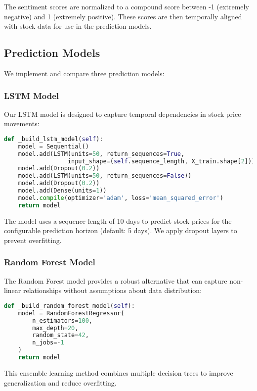 \documentclass[review]{elsarticle}
\begin{document}
The sentiment scores are normalized to a compound score between -1 (extremely negative) and 1 (extremely positive). These scores are then temporally aligned with stock data for use in the prediction models.

\subsection{Prediction Models}

We implement and compare three prediction models:

\subsubsection{LSTM Model}

Our LSTM model is designed to capture temporal dependencies in stock price movements:

\begin{lstlisting}[language=Python, caption=LSTM Model Architecture]
def _build_lstm_model(self):
    model = Sequential()
    model.add(LSTM(units=50, return_sequences=True, 
                  input_shape=(self.sequence_length, X_train.shape[2])))
    model.add(Dropout(0.2))
    model.add(LSTM(units=50, return_sequences=False))
    model.add(Dropout(0.2))
    model.add(Dense(units=1))
    model.compile(optimizer='adam', loss='mean_squared_error')
    return model
\end{lstlisting}

The model uses a sequence length of 10 days to predict stock prices for the configurable prediction horizon (default: 5 days). We apply dropout layers to prevent overfitting.

\subsubsection{Random Forest Model}

The Random Forest model provides a robust alternative that can capture non-linear relationships without assumptions about data distribution:

\begin{lstlisting}[language=Python, caption=Random Forest Model]
def _build_random_forest_model(self):
    model = RandomForestRegressor(
        n_estimators=100,
        max_depth=20,
        random_state=42,
        n_jobs=-1
    )
    return model
\end{lstlisting}

This ensemble learning method combines multiple decision trees to improve generalization and reduce overfitting.
\end{document}
